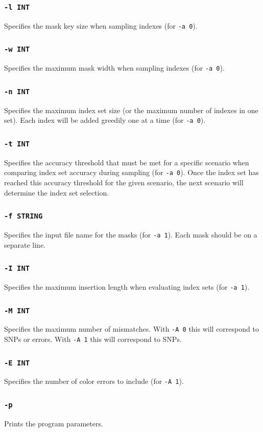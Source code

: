 \documentclass[a4paper,12pt]{book}
\newcommand{\TT}[1]{{\tt #1}} %
\begin{document}
\subsubsection{\TT{-l INT}}
Specifies the mask key size when sampling indexes (for \TT{-a 0}).
\subsubsection{\TT{-w INT}}
Specifies the maximum mask width when sampling indexes (for \TT{-a 0}).
\subsubsection{\TT{-n INT}}
Specifies the maximum index set size (or the maximum number of indexes in one set).
Each index will be added greedily one at a time (for \TT{-a 0}).
\subsubsection{\TT{-t INT}}
Specifies the accuracy threshold that must be met for a specific scenario when comparing index set accuracy during sampling (for \TT{-a 0}).
Once the index set has reached this accuracy threshold for the given scenario, the next scenario will determine the index set selection.
\subsubsection{\TT{-f STRING}}
Specifies the input file name for the masks (for \TT{-a 1}).
Each mask should be on a separate line.
\subsubsection{\TT{-I INT}}
Specifies the maximum insertion length when evaluating index sets (for \TT{-a 1}).
\subsubsection{\TT{-M INT}}
Specifies the maximum number of mismatches.
With \TT{-A 0} this will correspond to SNPs or errors.
With \TT{-A 1} this will correspond to SNPs.
\subsubsection{\TT{-E INT}}
Specifies the number of color errors to include (for \TT{-A 1}).
\subsubsection{\TT{-p}}
Prints the program parameters.
\end{document}
